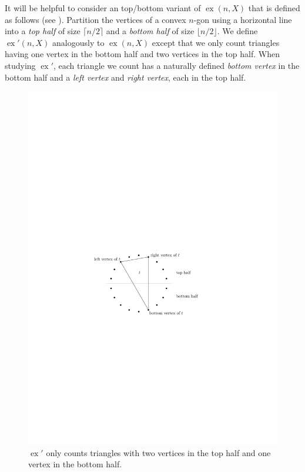 \documentclass{patmorin}
\DeclareMathOperator{\ex}{ex}
\begin{document}
It will be helpful to consider an top/bottom variant of $\ex(n,X)$ that
is defined as follows (see ).  Partition the vertices
of a convex $n$-gon using a horizontal line into a \emph{top half} of size
$\lceil n/2\rceil$ and a \emph{bottom half} of size $\lfloor n/2\rfloor$.
We define $\ex'(n,X)$ analogously to $\ex(n,X)$ except that we only count
triangles having one vertex in the bottom half and two vertices in the
top half.  When studying $\ex'$, each triangle we count has a naturally
defined \emph{bottom vertex} in the bottom half and a \emph{left vertex}
and \emph{right vertex}, each in the top half.

\begin{figure}
  \begin{center}
    \includegraphics{figs/left-right}
  \end{center}
  \caption{$\ex'$ only counts triangles with two vertices in the top half
     and one vertex in the bottom half.}
\end{figure}
\end{document}
